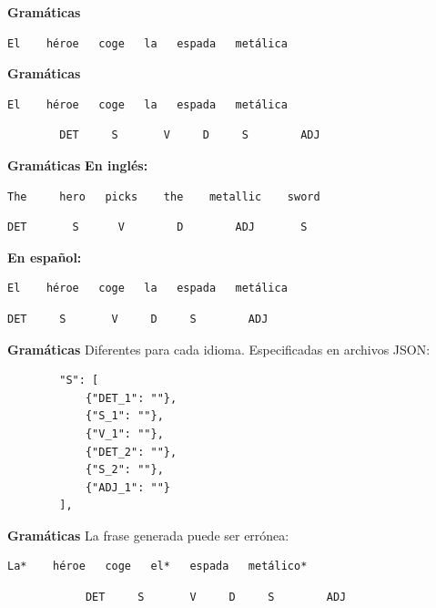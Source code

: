 \begin{frame}[t, fragile]{\textbf{Gramáticas}}
	\vspace*{\fill}
	\begin{Verbatim}
El    héroe   coge   la   espada   metálica
	\end{Verbatim}
	\vspace*{\fill}
\end{frame}

\begin{frame}[t, fragile]{\textbf{Gramáticas}}
	\vspace*{\fill}
	\begin{Verbatim}
El    héroe   coge   la   espada   metálica
	\end{Verbatim}
	\begin{verbatim}
		DET     S       V     D     S        ADJ
	\end{verbatim}
	\vspace*{\fill}
\end{frame}

\begin{frame}[t, fragile]{\textbf{Gramáticas}}
\textbf{En inglés:}

	\begin{Verbatim}
The     hero   picks    the    metallic    sword
	\end{Verbatim}
	\begin{Verbatim}
DET       S      V        D        ADJ       S
	\end{Verbatim}
\vspace*{12px}
\textbf{En español:}
	\begin{Verbatim}
El    héroe   coge   la   espada   metálica
	\end{Verbatim}
	\begin{Verbatim}
DET     S       V     D     S        ADJ
	\end{Verbatim}
\end{frame}

\begin{frame}[t, fragile]{\textbf{Gramáticas}}
Diferentes para cada idioma. Especificadas en archivos JSON:
	\begin{verbatim}
		"S": [
	    	{"DET_1": ""},
	    	{"S_1": ""},
	    	{"V_1": ""},
	    	{"DET_2": ""},
	    	{"S_2": ""},
	    	{"ADJ_1": ""}
		],
	\end{verbatim}
\end{frame}

\begin{frame}[t, fragile]{\textbf{Gramáticas}}
La frase generada puede ser errónea:
	\vspace*{\fill}
		\begin{Verbatim}[commandchars=+\[\]]
La*    héroe   coge   el*   espada   metálico*
		\end{Verbatim}
		\begin{verbatim}
			DET     S       V     D     S        ADJ
		\end{verbatim}
	\vspace*{\fill}
\end{frame}

